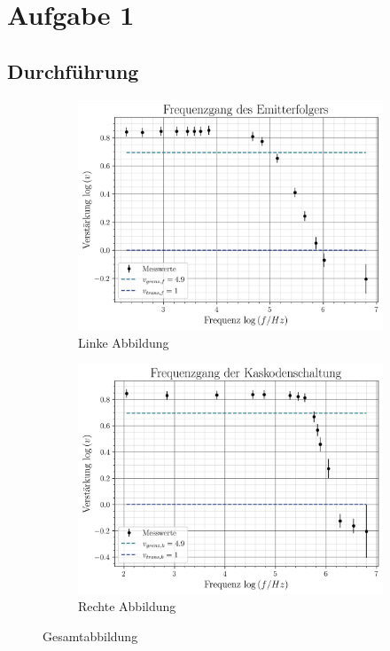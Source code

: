 \section{Aufgabe 1}


\subsection{Durchführung}

    \begin{figure}[H]
        \centering
        \begin{subfigure}{0.4\textwidth}
            \includegraphics[width=\linewidth]{figs/V4_2e_emitter.jpg}
            \caption{Linke Abbildung}
        \end{subfigure}
        \hspace{1cm}
        \begin{subfigure}{0.4\textwidth}
            \includegraphics[width=\linewidth]{figs/V4_2e_kaskode.jpg}
            \caption{Rechte Abbildung}
            \label{fig:frequ_kaskode}
        \end{subfigure}
        \caption{Gesamtabbildung}
    \end{figure}


